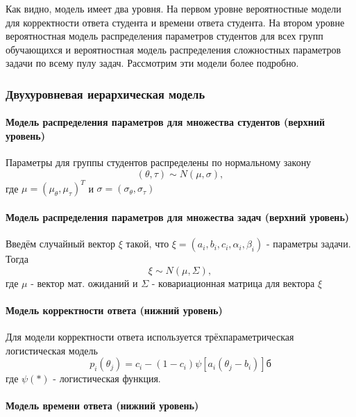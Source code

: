 Как видно, модель имеет два уровня. На первом уровне вероятностные модели для корректности ответа студента и времени ответа студента. На втором уровне вероятностная модель распределения параметров студентов для всех групп обучающихся и вероятностная модель распределения сложностных параметров задачи по всему пулу задач. Рассмотрим эти модели более подробно.

\subsubsection{Двухуровневая иерархическая модель}

\paragraph {Модель распределения параметров для множества студентов (верхний уровень)}
Параметры для группы студентов распределены по нормальному закону
\begin{equation}
(\theta,\tau) \sim N(\mu,\sigma),
\end{equation}
где $\mu = (\mu_\theta, \mu_\tau)^T$ и $\sigma=(\sigma_\theta,\sigma_\tau)$

\paragraph {Модель распределения параметров для множества задач (верхний уровень)}

Введём случайный вектор $\xi$ такой, что $\xi = (a_i,b_i,c_i,\alpha_i, \beta_i)$ - параметры задачи. Тогда
\begin{equation}
\xi \sim N(\mu,\Sigma),
\end{equation}
где $\mu$ - вектор мат. ожиданий и $\Sigma$ - ковариационная матрица для вектора  $\xi$

\paragraph {Модель корректности ответа (нижний уровень)}
Для модели корректности ответа используется трёхпараметрическая логистическая модель
\begin{equation}
p_i(\theta_j) = c_i - (1-c_i)\psi[a_i(\theta_j - b_i)]б
\end{equation}
где $\psi( * )$ - логистическая функция.

\paragraph {Модель времени ответа (нижний уровень)}
\label{mvonu}

